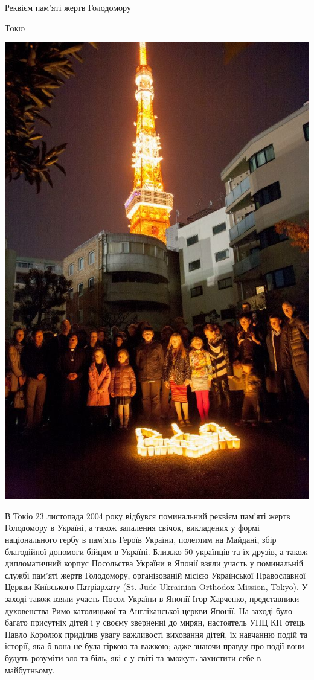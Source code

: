 \documentclass[10pt,a4paper]{article}
\newcommand{\NewsItem}[1]{%
		\usefont{T2A}{iwona}{m}{n} 
		\large #1 \vspace{4pt}
		\par \normalsize \normalfont}
\newcommand{\NewsAuthor}[1]{%
			\hfill \textsc{#1} \vspace{4pt}
			\par \normalfont}
\begin{document}
\begin{multicols}{3}
\vspace{1cm}
\NewsItem{Реквієм пам'яті жертв Голодомору}
\NewsAuthor{Токіо}
		\begin{center}
			\includegraphics[width=0.8\linewidth]{images/rekviem}
		\end{center}
В Токіо 23 листопада 2004 року відбувся поминальний реквієм пам'яті жертв Голодомору в Україні, а також запалення свічок, викладених у формі національного гербу в пам'ять Героїв України, полеглим на Майдані, збір благодійної допомоги бійцям в Україні.
Близько 50 українців та їх друзів, а також дипломатичний корпус Посольства України в Японії взяли участь у поминальній службі пам'яті жертв Голодомору, організованій місією Української Православної Церкви Київського Патріархату (St. Jude Ukrainian Orthodox Mission, Tokyo). У заході також взяли участь Посол України в Японії Ігор Харченко, представники духовенства Римо-католицької та Англіканської церкви Японії.
На заході було багато присутніх дітей і у своєму зверненні до мирян, настоятель УПЦ КП отець Павло Королюк приділив увагу важливості виховання дітей, їх навчанню подій та історії, яка б вона не була гіркою та важкою; адже знаючи правду про події вони будуть розуміти зло та біль, які є у світі та зможуть захистити себе в майбутньому.

\end{multicols}
\end{document}
